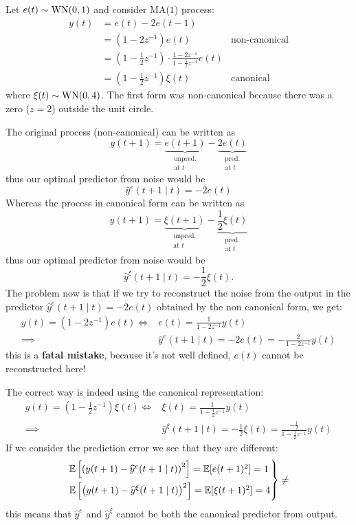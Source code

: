 \begin{example}
Let $e(t)\sim \operatorname{WN}(0,1)$ and consider MA($1$) process:
\begin{align*}
	y(t) &= e(t) - 2 e(t-1)\\
	&= (1-2z^{-1} )e(t) &\text{non-canonical}\\
	&=\left( 1-\frac{1}{2} z^{-1}  \right) \cdot\frac{1-2z^{-1}}{1-\frac{1}{2} z^{-1}} e(t)\\
	&=\left( 1-\frac{1}{2} z^{-1}  \right) \xi(t) &\text{canonical}
\end{align*}
where $\xi(t)\sim \operatorname{WN}(0,4)$. The first form was non-canonical because there was a zero ($z=2$) outside the unit circle.

The original process (non-canonical) can be written as
\[
	y(t+1)=\underbrace{e(t+1)}_{\substack{\text{unpred.}\\\text{at $t$}}}-\underbrace{2e(t)}_{\substack{\text{pred.}\\\text{at $t$}}}
\]
thus our optimal predictor from noise would be
\[
	\hat y^{e} (t+1\mid t) = -2e(t)
\]
Whereas the process in canonical form can be written as 
\[
	y(t+1) =\underbrace{\xi(t+1)}_{\substack{\text{unpred.}\\\text{at $t$}}}-\underbrace{\frac{1}{2} \xi(t)}_{\substack{\text{pred.}\\\text{at $t$}}}
\]
thus our optimal predictor from noise would be
\[
	\hat y^{\xi} (t+1\mid t)=-\frac{1}{2} \xi(t).
\]
The problem now is that if we try to reconstruct the noise from the output in the predictor $\hat y^{e} (t+1\mid t) = -2e(t)$ obtained by the non canonical form, we get:
\begin{align*}
	y(t)=(1-2z^{-1})e(t) \iff & e(t) =\frac{1}{1-2z^{-1}} y(t)\\
	\implies & \hat y^{e} (t+1\mid t) = -2e(t) = -\frac{2}{1-2z^{-1}}y(t)
\end{align*}
this is a \textbf{fatal mistake}, because it's not well defined, $e(t)$ cannot be reconstructed here!

The correct way is indeed using the canonical representation:
\begin{align*}
	y(t) = \left( 1-\frac{1}{2} z^{-1}  \right) \xi(t) \iff & \xi(t) = \frac{1}{1-\frac{1}{2} z^{-1} } y(t)\\
	\implies & \boxed{\hat y^{\xi} (t+1\mid t)= -\frac{1}{2} \xi(t) = \frac{-\frac{1}{2} }{1-\frac{1}{2} z^{-1} } y(t)}
\end{align*}
If we consider the prediction error we see that they are different:
\[
	\begin{rcases}
		\mathbb{E}\left[\left( y(t+1)-\widehat    y^{e}(t+1\mid t) \right)^2 \right] = \mathbb{E}[e(t+1)^2]   = 1\\
		\mathbb{E}\left[\left( y(t+1)-\widehat y ^{\xi}(t+1\mid t) \right)^2 \right] = \mathbb{E}[\xi(t+1)^2] = 4
	\end{rcases}
	\neq
\]
this means that $\hat y^{e} $ and $\hat y^{\xi} $ cannot be both the canonical predictor from output.
\end{example}

